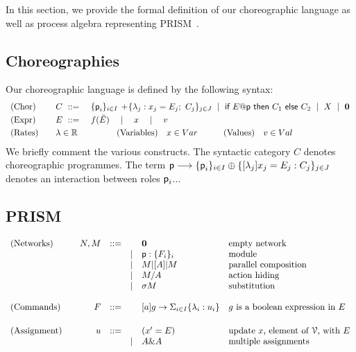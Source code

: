 In this section, we provide the formal definition of our choreographic
language as well as process algebra representing
PRISM~\cite{prismsemantics}.

\subsection{Choreographies}

 Our choreographic language is defined by the following
syntax:
%
\begin{displaymath}
  \begin{array}{lll}
    \text{(Chor)}  \quad & C \ ::=\
    & \{\role p_i\}_{i\in I}\,+\!\{\lambda_j: x_j=E_j;\ C_j\}_{j\in J}
      \ \mid\
      \textsf{if } E@\role{p} \textsf{ then } C_1 \textsf{ else } C_2
      \ \mid\
      X
      \ \mid\
      \CEnd
    \\[1mm]
    \text{(Expr)}\quad & E \ ::=\ & f(\tilde E)\quad\mid\quad x\quad\mid\quad v
    \\[1mm]
    \text{(Rates)}\quad       & \lambda\in\mathbb R
    & \qquad\quad
      \text{(Variables)}\quad    x\in\mathsf{Var} 
      \qquad\quad
      \text{(Values)}\quad       v\in\mathsf{Val} 
  \end{array}
\end{displaymath}
We briefly comment the various constructs. The syntactic category $C$
denotes choreographic programmes. The term
$\textsf{p}\longrightarrow\{\textsf{p}_i\}_{i\in I}\oplus\{[\lambda_j]
x_j=E_j: C_j\}_{j\in J}$ denotes an interaction between roles
$\textsf{p}_i$...


\subsection{PRISM}

\begin{displaymath}
  \begin{array}{lrllll}
    \text{(Networks)}  \quad
    & N, M  & ::=  &      & \mathbf{0} & \text{empty network}\\
    &       &      & \mid & \textsf{p}:\{F_i\}_i & \text{module}\\
    &       &      & \mid & M |[A]| M & \text{parallel composition}\\
    &       &      & \mid & M/A        & \text{action hiding}\\
    &       &      & \mid & \sigma M   & \text{substitution}\\
    \\
    \text{(Commands)}  \quad
    & F     & ::=  &      & [a] g \rightarrow \Sigma_{i\in I}\{\lambda_i: u_i\}
                                  & \text{$g$ is a boolean expression in $E$} \\
    \\[1mm]
    \text{(Assignment)} \quad
    & u     & ::=  &      & (x' = E) & \text{update $x$, element of $\mathcal V$, with $E$}\\
    &       &      & \mid & A \& A   & \text{multiple assignments}
  \end{array}
\end{displaymath}

